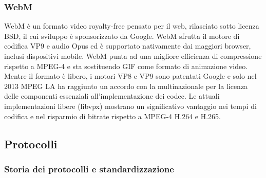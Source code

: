 		\subsubsection{WebM}
			WebM è un formato video royalty-free pensato per il web, rilasciato sotto licenza BSD, il cui sviluppo è sponsorizzato da Google. WebM sfrutta il motore di codifica VP9 e audio Opus ed è supportato nativamente dai maggiori browser, inclusi dispositivi mobile. WebM punta ad una migliore efficienza di compressione rispetto a MPEG-4 e sta sostituendo GIF come formato di animazione video. Mentre il formato è libero, i motori VP8 e VP9 sono patentati Google e solo nel 2013 MPEG LA ha raggiunto un accordo con la multinazionale per la licenza delle componenti essenziali all'implementazione dei codec. Le attuali implementazioni libere (libvpx) mostrano un significativo vantaggio nei tempi di codifica e nel risparmio di bitrate rispetto a MPEG-4 H.264 e H.265.
	\subsection{Protocolli}
		\subsubsection{Storia dei protocolli e standardizzazione}

